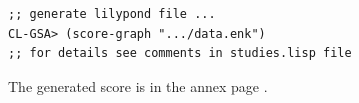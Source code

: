 \begin{lstlisting}
;; generate lilypond file ...
CL-GSA> (score-graph ".../data.enk")
;; for details see comments in studies.lisp file
\end{lstlisting}

\noindent The generated score is in the annex page \pageref{esg}.



